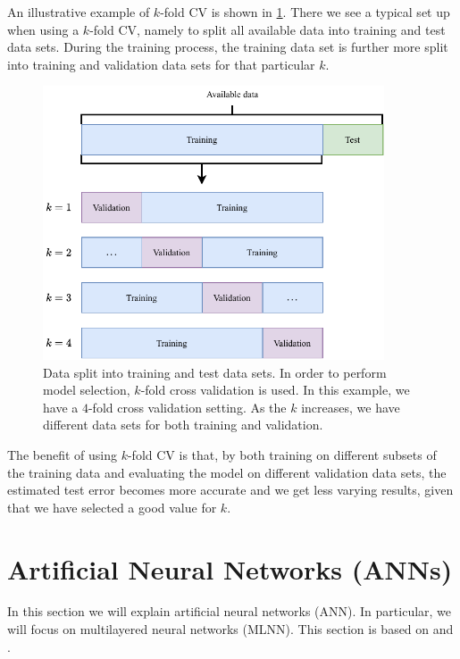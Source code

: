 An illustrative example of $k$-fold CV is shown in \cref{fig:k-fold-cv}. There we see a typical set up when using a $k$-fold CV, namely to split all available data into training and test data sets. During the training process, the training data set is further more split into training and validation data sets for that particular $k$.
\begin{figure}[H]
    \centering
    \includegraphics[width=0.9\textwidth]{thesis/figures/k-fold-cv_cropped.pdf}
    \caption{Data split into training and test data sets. In order to perform model selection, $k$-fold cross validation is used. In this example, we have a $4$-fold cross validation setting. As the $k$ increases, we have different data sets for both training and validation.}
    \label{fig:k-fold-cv}
\end{figure}

The benefit of using $k$-fold CV is that, by both training on different subsets of the training data and evaluating the model on different validation data sets, the estimated test error becomes more accurate and we get less varying results, given that we have selected a good value for $k$.

\section{Artificial Neural Networks (ANNs)}
In this section we will explain artificial neural networks (ANN). In particular, we will focus on multilayered neural networks (MLNN). This section is based on \cite[Chapter 1]{Aggarwal18} and \cite{rong2016word2vec}.

